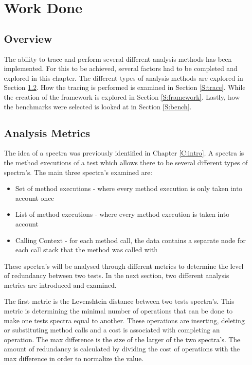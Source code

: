 \chapter{Work Done}\label{C:workdone}

\section{Overview}

The ability to trace and perform several different analysis methods has been implemented. For this to be achieved, several factors had to be completed and explored in this chapter. The different types of analysis methods are explored in Section \ref{S:analysis}. How the tracing is performed is examined in Section \ref{S:trace}. While the creation of the framework is explored in Section \ref{S:framework}. Lastly, how the benchmarks were selected is looked at in Section \ref{S:bench}.

\section{Analysis Metrics}
\label{S:analysis}

The idea of a spectra was previously identified in Chapter \ref{C:intro}. A spectra is the method executions of a test which allows there to be several different types of spectra's. The main three spectra's examined are:

\begin{itemize}
\item Set of method executions - where every method execution is only taken into account once
\item List of method executions - where every method execution is taken into account
\item Calling Context - for each method call, the data contains a separate node for each call stack that the method was called with \cite{callingcontext}
\end{itemize}
These spectra's will be analysed through different metrics to determine the level of redundancy between two tests. In the next section, two different analysis metrics are introduced and examined.

The first metric is the Levenshtein distance between two tests spectra's. This metric is determining the minimal number of operations that can be done to make one tests spectra equal to another. These operations are inserting, deleting or substituting method calls and a cost is associated with completing an operation. The max difference is the size of the larger of the two spectra's. The amount of redundancy is calculated by dividing the cost of operations with the max difference in order to normalize the value.

